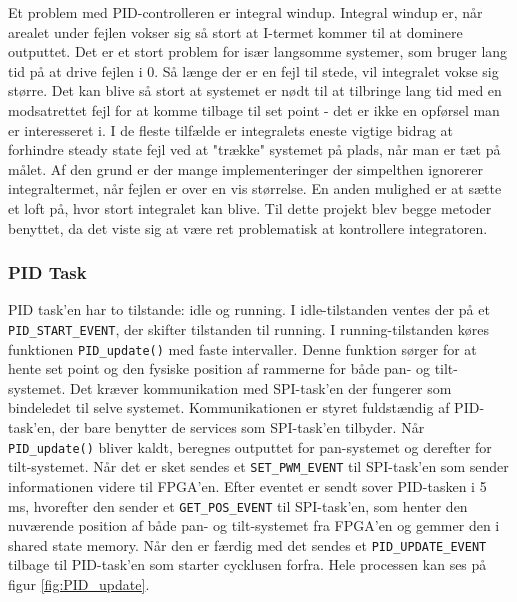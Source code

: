 Et problem med PID-controlleren er integral windup. Integral windup er, når arealet under fejlen vokser sig så stort at I-termet kommer til at dominere outputtet. Det er et stort problem for især langsomme systemer, som bruger lang tid på at drive fejlen i 0. Så længe der er en fejl til stede, vil integralet vokse sig større. Det kan blive så stort at systemet er nødt til at tilbringe lang tid med en modsatrettet fejl for at komme tilbage til set point - det er ikke en opførsel man er interesseret i. I de fleste tilfælde er integralets eneste vigtige bidrag at forhindre steady state fejl ved at "trække" systemet på plads, når man er tæt på målet. Af den grund er der mange implementeringer der simpelthen ignorerer integraltermet, når fejlen er over en vis størrelse. En anden mulighed er at sætte et loft på, hvor stort integralet kan blive. Til dette projekt blev begge metoder benyttet, da det viste sig at være ret problematisk at kontrollere integratoren. 

\subsubsection{PID Task}

PID task'en har to tilstande: idle og running. I idle-tilstanden ventes der på et \texttt{PID\_START\_EVENT}, der skifter tilstanden til running. I running-tilstanden køres funktionen \texttt{PID\_update()} med faste intervaller. Denne funktion sørger for at hente set point og den fysiske position af rammerne for både pan- og tilt-systemet. Det kræver kommunikation med SPI-task'en der fungerer som bindeledet til selve systemet. Kommunikationen er styret fuldstændig af PID-task'en, der bare benytter de services som SPI-task'en tilbyder. Når \texttt{PID\_update()} bliver kaldt, beregnes outputtet for pan-systemet og derefter for tilt-systemet. Når det er sket sendes et \texttt{SET\_PWM\_EVENT} til SPI-task'en som sender informationen videre til FPGA'en. Efter eventet er sendt sover PID-tasken i 5 ms, hvorefter den sender et \texttt{GET\_POS\_EVENT} til SPI-task'en, som henter den nuværende position af både pan- og tilt-systemet fra FPGA'en og gemmer den i shared state memory. Når den er færdig med det sendes et \texttt{PID\_UPDATE\_EVENT} tilbage til PID-task'en som starter cycklusen forfra. Hele processen kan ses på figur \ref{fig:PID_update}.

